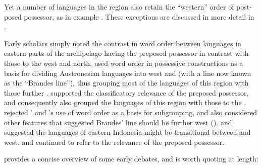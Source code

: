 Yet a number of languages in the region also retain the “western”
order of post-posed possessor, as in example .
These exceptions are discussed in more detail in .

\begin{exe}
	\label{ex:01-04}
	\sn{\gll	{} kətu {} {} {\j}ohani {}\\
						[ head \bracr{\sub{POSSESSED}} [ John \bracr{\sub{POSSESSOR}}\\
			\glt	`John's head'}
\end{exe}

Early scholars simply noted the contrast in word order between languages
in eastern parts of the archipelago having the preposed possessor in contrast
with those to the west and north.
\citet{Brandes1884} used word order in possessive constructions
as a basis for dividing Austronesian languages into west
and  (with a line now known as the “Brandes line”),
thus grouping most of the languages of this region with those further .
\citet{Friederici1913} supported the classificatory relevance of the preposed possessor,
and consequently also grouped the languages of this region with those to the .
\citet{Jonker1914} rejected \citeauthor{Brandes1884}’
and \citeauthor{Friederici1913}’s use of word order as a basis for subgrouping,
and also considered other features that suggested Brandes’
line should be further west (\citeyear[367]{Jonker1914}).
\citet{Kern1906} and \citet{KanskiKasprusch1931} suggested the languages of
eastern Indonesia might be transitional between  and west.
\citet{Cowan1951} and \citet{Cappell1976}
continued to refer to the relevance of the preposed possessor.

\citet[235f]{Dyen1978b} provides a concise overview of
some early debates, and is worth quoting at length:

